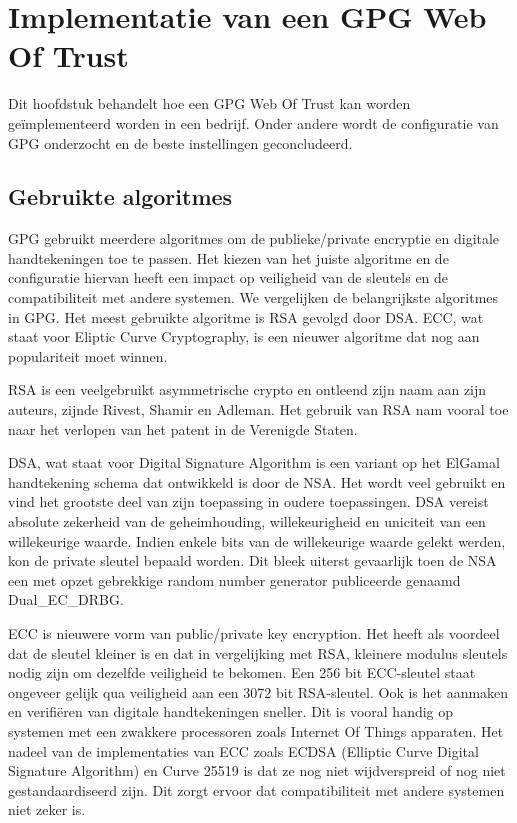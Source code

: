 \chapter{Implementatie van een GPG Web Of Trust}
\label{ch:implementatie-van-een-gpg-web-of-trust}

Dit hoofdstuk behandelt hoe een GPG Web Of Trust kan worden geïmplementeerd
worden in een bedrijf. Onder andere wordt de configuratie van GPG onderzocht en
de beste instellingen geconcludeerd.

\section{Gebruikte algoritmes}
\label{sec:gebruikte-algoritmes}

GPG gebruikt meerdere algoritmes om de publieke/private encryptie en digitale
handtekeningen toe te passen. Het kiezen van het juiste algoritme en de
configuratie hiervan heeft een impact op veiligheid van de sleutels en de
compatibiliteit met andere systemen. We vergelijken de belangrijkste algoritmes
in GPG. Het meest gebruikte algoritme is RSA gevolgd door DSA. ECC, wat staat
voor Eliptic Curve Cryptography, is een nieuwer algoritme dat nog aan
populariteit moet winnen.

RSA is een veelgebruikt asymmetrische crypto en ontleend zijn naam aan zijn
auteurs, zijnde Rivest, Shamir en Adleman. Het gebruik van RSA nam vooral toe
naar het verlopen van het patent in de Verenigde Staten.

DSA, wat staat voor Digital Signature Algorithm is een variant op het ElGamal
handtekening schema dat ontwikkeld is door de NSA. Het wordt veel gebruikt en
vind het grootste deel van zijn toepassing in oudere toepassingen. DSA vereist
absolute zekerheid van de geheimhouding, willekeurigheid en uniciteit van een
willekeurige waarde. Indien enkele bits van de willekeurige waarde gelekt
werden, kon de private sleutel bepaald worden. Dit bleek uiterst gevaarlijk toen
de NSA een met opzet gebrekkige random number generator publiceerde genaamd
Dual\_EC\_DRBG.

ECC is nieuwere vorm van public/private key encryption. Het heeft als voordeel
dat de sleutel kleiner is en dat in vergelijking met RSA, kleinere modulus
sleutels nodig zijn om dezelfde veiligheid te bekomen. Een 256 bit ECC-sleutel
staat ongeveer gelijk qua veiligheid aan een 3072 bit RSA-sleutel. Ook is het
aanmaken en verifiëren van digitale handtekeningen sneller.
\autocite{HighSpeedHighSecuritySignatures} Dit is vooral handig op systemen met
een zwakkere processoren zoals Internet Of Things apparaten. Het nadeel van de
implementaties van ECC zoals ECDSA (Elliptic Curve Digital Signature Algorithm)
en Curve 25519 is dat ze nog niet wijdverspreid of nog niet gestandaardiseerd
zijn. Dit zorgt ervoor dat compatibiliteit met andere systemen niet zeker is.

